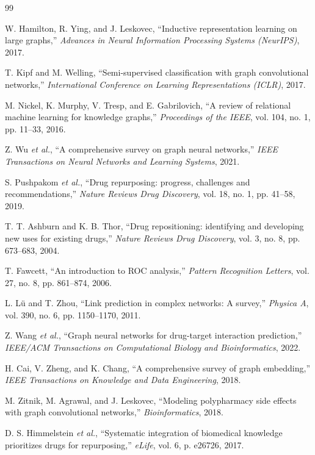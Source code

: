 \documentclass[conference,a4paper]{IEEEtran}
\begin{document}
\begin{thebibliography}{99}


 W. Hamilton, R. Ying, and J. Leskovec, 
``Inductive representation learning on large graphs,'' 
\textit{Advances in Neural Information Processing Systems (NeurIPS)}, 2017.

 T. Kipf and M. Welling, 
``Semi-supervised classification with graph convolutional networks,''
\textit{International Conference on Learning Representations (ICLR)}, 2017.

 M. Nickel, K. Murphy, V. Tresp, and E. Gabrilovich, 
``A review of relational machine learning for knowledge graphs,'' 
\textit{Proceedings of the IEEE}, vol. 104, no. 1, pp. 11--33, 2016.

 Z. Wu \textit{et al.}, 
``A comprehensive survey on graph neural networks,'' 
\textit{IEEE Transactions on Neural Networks and Learning Systems}, 2021.

 S. Pushpakom \textit{et al.}, 
``Drug repurposing: progress, challenges and recommendations,'' 
\textit{Nature Reviews Drug Discovery}, vol. 18, no. 1, pp. 41--58, 2019.

 T. T. Ashburn and K. B. Thor, 
``Drug repositioning: identifying and developing new uses for existing drugs,'' 
\textit{Nature Reviews Drug Discovery}, vol. 3, no. 8, pp. 673--683, 2004.

 T. Fawcett, 
``An introduction to ROC analysis,'' 
\textit{Pattern Recognition Letters}, vol. 27, no. 8, pp. 861--874, 2006.

 L. Lü and T. Zhou, 
``Link prediction in complex networks: A survey,'' 
\textit{Physica A}, vol. 390, no. 6, pp. 1150--1170, 2011.

 Z. Wang \textit{et al.}, 
``Graph neural networks for drug-target interaction prediction,'' 
\textit{IEEE/ACM Transactions on Computational Biology and Bioinformatics}, 2022.

 H. Cai, V. Zheng, and K. Chang, 
``A comprehensive survey of graph embedding,'' 
\textit{IEEE Transactions on Knowledge and Data Engineering}, 2018.

 M. Zitnik, M. Agrawal, and J. Leskovec, 
``Modeling polypharmacy side effects with graph convolutional networks,''
\textit{Bioinformatics}, 2018.


 D. S. Himmelstein \textit{et al.}, 
``Systematic integration of biomedical knowledge prioritizes drugs for repurposing,''
\textit{eLife}, vol. 6, p. e26726, 2017.


\end{thebibliography}
\end{document}
